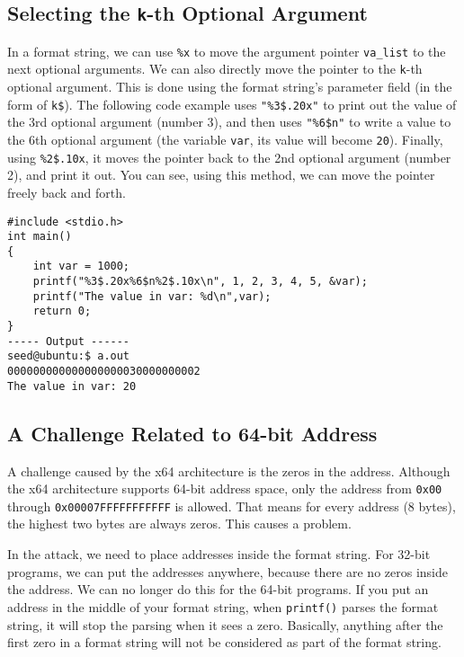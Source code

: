 \subsection{Selecting the \texttt{k}-th Optional Argument} 
\label{subsec:kth}

In a format string, we can use \texttt{\%x} to move the 
argument pointer \texttt{va\_list} to the next optional arguments. 
We can also directly move the pointer to the \texttt{k}-th optional argument. 
This is done using the format string's parameter field (in the form of
\texttt{k\$}). 
The following code example uses \texttt{"\%3\$.20x"} to print out the value of the
3rd optional argument (number 3), and then uses \texttt{"\%6\$n"} to write
a value to the 6th optional argument (the variable \texttt{var}, its
value will become \texttt{20}). Finally, 
using \texttt{\%2\$.10x}, it moves the pointer back to the 2nd 
optional argument (number 2), and print it out. You can see,
using this method, we can move the pointer freely back and forth.

\begin{lstlisting}
#include <stdio.h>
int main()
{
    int var = 1000;
    printf("%3$.20x%6$n%2$.10x\n", 1, 2, 3, 4, 5, &var);
    printf("The value in var: %d\n",var);
    return 0;
}
----- Output ------
seed@ubuntu:$ a.out
000000000000000000030000000002
The value in var: 20
\end{lstlisting}





\subsection{A Challenge Related to 64-bit Address} 

A challenge caused by the x64 architecture is the zeros in the address.
Although the x64 architecture
supports 64-bit address space, only the address from
\texttt{0x00} through \texttt{0x00007FFFFFFFFFFF} is allowed. That means for
every address (8 bytes), the highest two bytes are always zeros.
This causes a problem.

In the attack, we need to place addresses inside the format string. For 
32-bit programs, we can put the addresses anywhere, because there 
are no zeros inside the address. We can no longer do this
for the 64-bit programs. If you put an address in the middle of 
your format string, when \texttt{printf()} parses the 
format string, it will stop the parsing when it sees a zero. Basically,
anything after the first zero in a format string will not 
be considered as part of the format string. 

